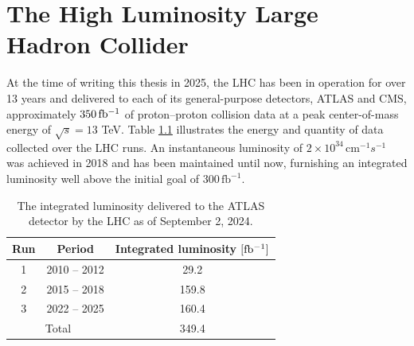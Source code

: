 \chapter{The High Luminosity Large Hadron Collider}


At the time of writing this thesis in 2025, the LHC has been in operation for over 13 years and delivered to each of its general-purpose detectors, 
ATLAS and CMS, approximately $350\,\mbox{fb\(^{-1}\)}$ of proton--proton collision data at a peak center-of-mass energy of $\sqrt{s}=13$ TeV. 
Table \ref{tab:lhc-int-lumi} illustrates  the energy and quantity of data collected over the LHC runs. 
An instantaneous luminosity of $2\times 10^{34} \, \mathrm{cm}^{-1}s^{-1}$ was achieved in 2018 and has been maintained until now, 
furnishing an integrated luminosity well above the initial goal of $300\,\mathrm{fb}^{-1}$.

\begin{table}[h!]
    \centering
    \begin{tabular}{|c|c|c|}
    \hline
        Run & Period & Integrated luminosity $[\mbox{fb\(^{-1}\)}]$ \\ \hline
        1 & 2010 -- 2012 & 29.2 \\
        2 & 2015 -- 2018 & 159.8 \\
        3 & 2022 -- 2025 & 160.4 \\ \hline \hline
        \multicolumn{2}{|c|}{Total} & 349.4 \\
        \hline
    \end{tabular}
    \caption{The integrated luminosity delivered to the ATLAS detector by the LHC as of September 2, 2024. }
    \label{tab:lhc-int-lumi}
\end{table}

